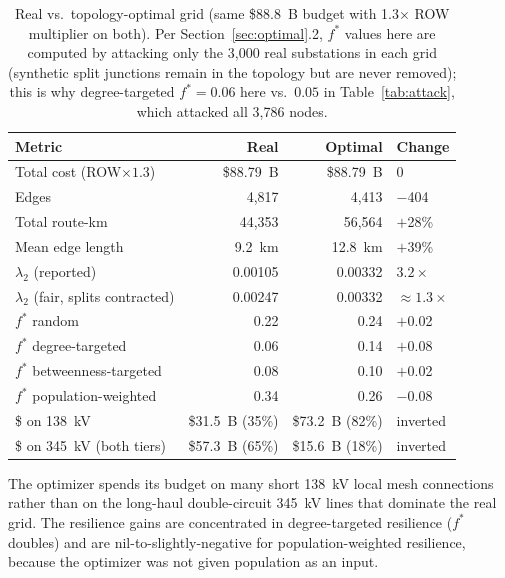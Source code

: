 \documentclass[12pt,letterpaper]{article}
\begin{document}
\begin{table}[h]
\centering
\caption{Real vs.\ topology-optimal grid (same \$88.8~B budget with 1.3$\times$ ROW multiplier on both). Per Section~\ref{sec:optimal}.2, $f^*$ values here are computed by attacking only the 3{,}000 real substations in each grid (synthetic split junctions remain in the topology but are never removed); this is why degree-targeted $f^* = 0.06$ here vs.\ $0.05$ in Table~\ref{tab:attack}, which attacked all 3{,}786 nodes.}
\label{tab:real_vs_opt}
\begin{tabular}{@{}lrrl@{}}
\toprule
\textbf{Metric} & \textbf{Real} & \textbf{Optimal} & \textbf{Change} \\
\midrule
Total cost (ROW$\times 1.3$)      & \$88.79~B & \$88.79~B & 0 \\
Edges                              & 4{,}817   & 4{,}413   & $-$404 \\
Total route-km                     & 44{,}353  & 56{,}564  & $+$28\% \\
Mean edge length                   & 9.2~km    & 12.8~km   & $+$39\% \\
$\lambda_2$ (reported)             & 0.00105   & 0.00332   & $3.2\times$ \\
$\lambda_2$ (fair, splits contracted) & 0.00247 & 0.00332 & $\approx 1.3\times$ \\
\midrule
$f^*$ random                       & 0.22 & 0.24 & $+$0.02 \\
$f^*$ degree-targeted              & 0.06 & 0.14 & $+$0.08 \\
$f^*$ betweenness-targeted         & 0.08 & 0.10 & $+$0.02 \\
$f^*$ population-weighted          & 0.34 & 0.26 & $-$0.08 \\
\midrule
\$ on 138~kV                       & \$31.5~B (35\%) & \$73.2~B (82\%) & inverted \\
\$ on 345~kV (both tiers)          & \$57.3~B (65\%) & \$15.6~B (18\%) & inverted \\
\bottomrule
\end{tabular}
\end{table}

The optimizer spends its budget on many short 138~kV local mesh connections rather than on the long-haul double-circuit 345~kV lines that dominate the real grid. The resilience gains are concentrated in degree-targeted resilience ($f^*$ doubles) and are nil-to-slightly-negative for population-weighted resilience, because the optimizer was not given population as an input.
\end{document}
